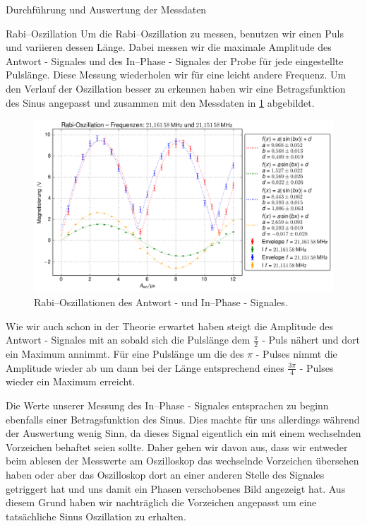 \documentclass[pdftex, a4paper,11pt, twoside, ngerman]{report}
\begin{document}
\begin{chapter}{Durchführung und Auswertung der Messdaten}
    \begin{section}{Rabi--Oszillation}
      \label{chpRabi}
      Um die Rabi--Oszillation zu messen, benutzen wir einen Puls und variieren
      dessen Länge.
      Dabei messen wir die maximale Amplitude des Antwort - Signales und des
      In--Phase - Signales der Probe für jede eingestellte Pulslänge.
      Diese Messung wiederholen wir für eine leicht andere Frequenz.
      Um den Verlauf der Oszillation besser zu erkennen haben wir eine
      Betragsfunktion des Sinus angepasst und zusammen mit den Messdaten in
      \cref{figRabifreq12} abgebildet.
      \begin{figure}[htbp]
        \centering
        \includegraphics[width=\textwidth]{Figures/Rabi_freq12.png}
        \caption{Rabi--Oszillationen des Antwort - und In--Phase - Signales.}
        \label{figRabifreq12}
      \end{figure}
      
      Wie wir auch schon in der Theorie erwartet haben steigt die Amplitude
      des Antwort - Signales mit an sobald sich die Pulslänge dem
      $\frac{\pi}{2}$ - Puls nähert und dort ein Maximum annimmt.
      Für eine Pulslänge um die des $\pi$ - Pulses nimmt die Amplitude wieder
      ab um dann bei der Länge entsprechend eines $\frac{3\pi}{4}$ - Pulses
      wieder ein Maximum erreicht.
      
      Die Werte unserer Messung des In--Phase - Signales entsprachen zu beginn
      ebenfalls einer Betragsfunktion des Sinus.
      Dies machte für uns allerdings während der Auswertung wenig Sinn, da
      dieses Signal eigentlich ein mit einem wechselnden Vorzeichen behaftet
      seien sollte.
      Daher gehen wir davon aus, dass wir entweder beim ablesen der Messwerte am
      Oszilloskop das wechselnde Vorzeichen übersehen haben oder aber das
      Oszilloskop dort an einer anderen Stelle des Signales getriggert hat
      und uns damit ein Phasen verschobenes Bild angezeigt hat.
      Aus diesem Grund haben wir nachträglich die Vorzeichen angepasst um eine
      tatsächliche Sinus Oszillation zu erhalten.
      

\end{section}
\end{chapter}
\end{document}
